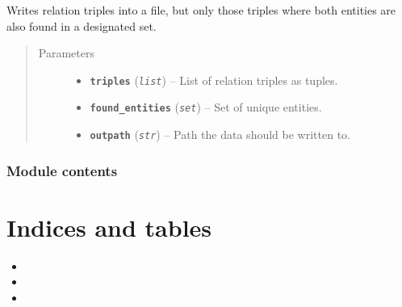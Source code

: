\documentclass[letterpaper,10pt,english]{sphinxmanual}
\begin{document}
\begin{fulllineitems}
\label{src.trans_e:src.trans_e.trans_we.write_data}
Writes relation triples into a file, but only those triples where both entities are also found in a designated
set.
\begin{quote}\begin{description}
\item[{Parameters}] \leavevmode\begin{itemize}
\item {} 
\textbf{\texttt{triples}} (\emph{\texttt{list}}) -- List of relation triples as tuples.

\item {} 
\textbf{\texttt{found\_entities}} (\emph{\texttt{set}}) -- Set of unique entities.

\item {} 
\textbf{\texttt{outpath}} (\emph{\texttt{str}}) -- Path the data should be written to.

\end{itemize}

\end{description}\end{quote}

\end{fulllineitems}



\subsection{Module contents}
\label{src:module-src}\label{src:module-contents}

\chapter{Indices and tables}
\label{index:indices-and-tables}\begin{itemize}
\item {} 

\item {} 

\item {} 

\end{itemize}
\end{document}
